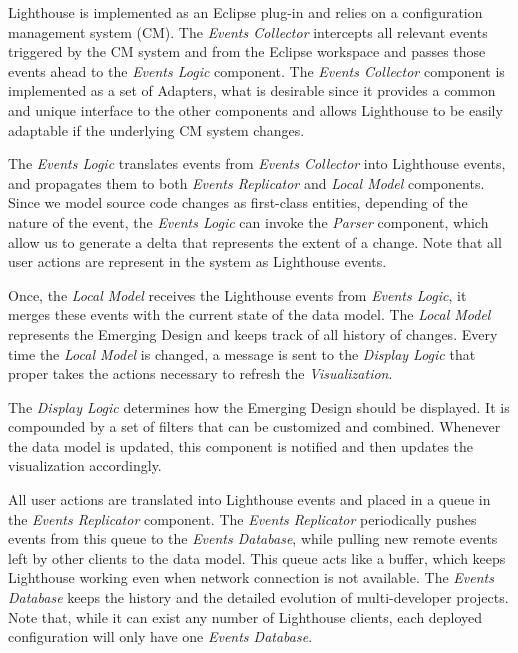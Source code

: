 \documentclass[10pt, conference, compsocconf]{IEEEtran}
\begin{document}
Lighthouse is implemented as an Eclipse plug-in and relies on a configuration management system (CM). The \textit{Events Collector} intercepts all relevant events triggered by the CM system and from the Eclipse workspace and passes those events ahead to the \textit{Events Logic} component. The \textit{Events Collector} component is implemented as a set of Adapters, what is desirable since it provides a common and unique interface to the other components and allows Lighthouse to be easily adaptable if the underlying CM system changes.

The \textit{Events Logic} translates events from \textit{Events Collector} into Lighthouse events, and propagates them to both \textit{Events Replicator} and \textit{Local Model} components. Since we model source code changes as first-class entities, depending of the nature of the event, the \textit{Events Logic} can invoke the \textit{Parser} component, which allow us to generate a delta that represents the extent of a change. Note that all user actions are represent in the system as Lighthouse events.

Once, the \textit{Local Model} receives the Lighthouse events from \textit{Events Logic}, it merges these events with the current state of the data model. The \textit{Local Model} represents the Emerging Design and keeps track of all history of changes. Every time the \textit{Local Model} is changed, a message is sent to the \textit{Display Logic} that proper takes the actions necessary to refresh the \textit{Visualization}.

The \textit{Display Logic} determines how the Emerging Design should be displayed. It is compounded by a set of filters that can be customized and combined. Whenever the data model is updated, this component is notified and then updates the visualization accordingly. 

All user actions are translated into Lighthouse events and placed in a queue in the \textit{Events Replicator} component. The \textit{Events Replicator} periodically pushes events from this queue to the \textit{Events Database}, while pulling new remote events left by other clients to the data model. This queue acts like a buffer, which keeps Lighthouse working even when network connection is not available. The \textit{Events Database} keeps the history and the detailed evolution of multi-developer projects. Note that, while it can exist any number of Lighthouse clients, each deployed configuration will only have one \textit{Events Database}.
\end{document}

